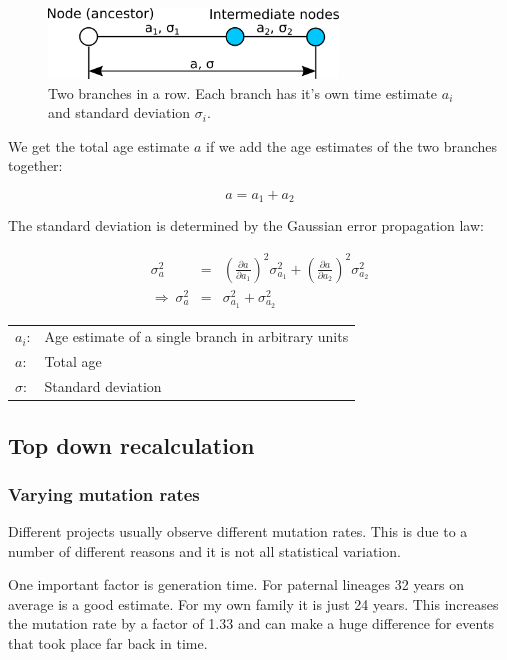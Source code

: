 \begin{figure}[ht]
\centering
\includegraphics[width=7.7cm]{img/nodes_in_row.png}
\caption{\label{nodes_in_row} Two branches in a row.
Each branch has it's own time estimate
$a_i$ and standard deviation $\sigma_i$.}
\end{figure}

We get the total age estimate $a$ if we add the age estimates
of the two branches together:

\begin{equation}
a = a_1 + a_2
\end{equation}

The standard deviation is determined by the Gaussian error
propagation law:

\begin{eqnarray}
\sigma_a^2 & = & \left( \frac{\partial a}{\partial a_1} \right)^2 \sigma_{a_1}^2
+ \left( \frac{\partial a}{\partial a_2} \right)^2 \sigma_{a_2}^2\\
\Rightarrow\ \sigma_a^2 & = & \sigma_{a_1}^2 + \sigma_{a_2}^2
\end{eqnarray}

\begin{tabular}{ll}
$a_i$: &  Age estimate of a single branch in arbitrary units\\
$a$: & Total age\\
$\sigma$: &  Standard deviation
\end{tabular}
\vspace{1em}



\subsection{Top down recalculation}

\subsubsection*{Varying mutation rates}

Different projects usually observe different mutation rates.
This is due to a number of different reasons and it is not all
statistical variation.

One important factor is generation time. For paternal lineages
32 years on average is a good estimate. For my own family it is
just 24 years. This increases the mutation rate by a factor of
1.33 and can make a huge difference for events that took place
far back in time. 

